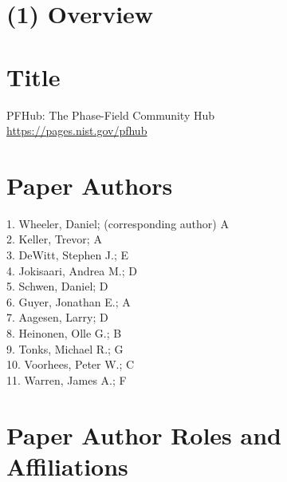 \documentclass{jors}
\begin{document}
\newcommand\githublink[1]{\href{https://github.com/#1/}{\texttt{\textbf{@#1}}}}




\section*{(1) Overview}

\vspace{0.5cm}

\section*{Title}
\par\bigskip
PFHub: The Phase-Field Community Hub\\[\baselineskip]
\url{https://pages.nist.gov/pfhub}

\section*{Paper Authors}

1. Wheeler, Daniel; (corresponding author) A\\
2. Keller, Trevor; A\\
3. DeWitt, Stephen J.; E\\
4. Jokisaari, Andrea M.; D\\
5. Schwen, Daniel; D\\
6. Guyer, Jonathan E.; A\\
7. Aagesen, Larry; D\\
8. Heinonen, Olle G.; B\\
9. Tonks, Michael R.; G\\
10. Voorhees, Peter W.; C\\
11. Warren, James A.; F

\section*{Paper Author Roles and Affiliations}
\end{document}
